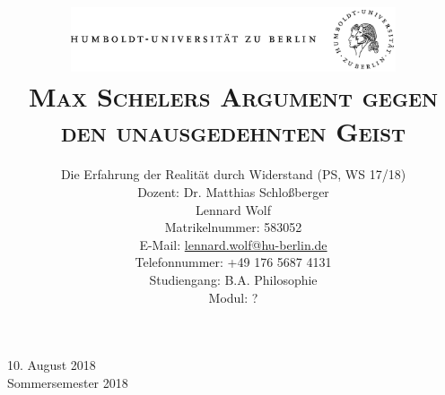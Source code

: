 \documentclass[a4paper, 12pt]{article}
\date{\vspace{-3ex}}
\begin{document}
\title{\vspace{5ex}
	\includegraphics*[bb=0 0 720 200, width=0.72\textwidth]{ErstesSem/images/hu_logo.png}\\
	\vspace{30pt}
	\scshape\LARGE{Max Schelers Argument gegen den unausgedehnten Geist}\\\vspace{20pt}}
	


\author{Die Erfahrung der Realität durch Widerstand (PS, WS 17/18)\\
	\vspace{7pt}
          Dozent: Dr. Matthias Schloßberger\\\vspace{4pt}Lennard Wolf\\
        \small{Matrikelnummer: 583052}\\
        \small{E-Mail: \href{mailto:lennard.wolf@hu-berlin.de}{lennard.wolf@hu-berlin.de}}\\
        \small{Telefonnummer: +49 176 5687 4131}\\
        \small{Studiengang: B.A. Philosophie}\\
        \small{Modul: ?}}

\maketitle

\vspace{\fill}

\begin{minipage}[]{0.92\textwidth}
    \centering
    \onehalfspacing
    \large   
    10. August 2018\\
    Sommersemester 2018

    \vspace{-20mm} 
\end{minipage}%
\thispagestyle{empty}
\newpage
\setcounter{page}{1}
\end{document}

